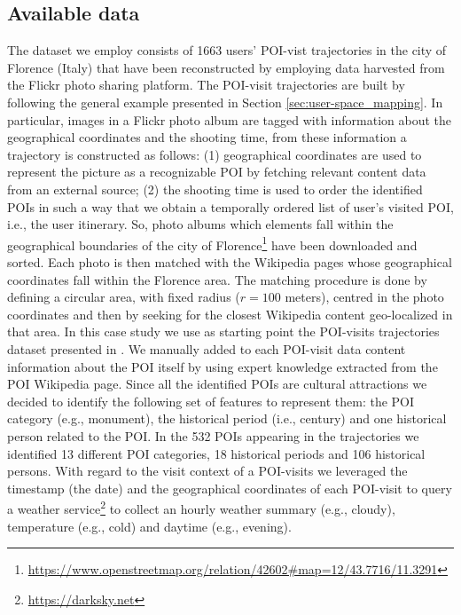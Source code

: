 \subsection{Available data}
The dataset we employ consists of 1663 users' POI-vist trajectories in the city of Florence (Italy) that have been reconstructed by employing data harvested from the Flickr photo sharing platform.
The POI-visit trajectories are built by following the general example presented in Section \ref{sec:user-space_mapping}.
In particular, images in a Flickr photo album are tagged with information about the geographical coordinates and the shooting time, from these information a trajectory is constructed as follows: (1) geographical coordinates are used to represent the picture as a recognizable POI by fetching relevant content data from an external source; (2) the shooting time is used to order the identified POIs in such a way that we obtain a temporally ordered list of user's visited POI, i.e., the user itinerary. 
So, photo albums which elements fall within the geographical boundaries of the city of Florence\footnote{\url{https://www.openstreetmap.org/relation/42602\#map=12/43.7716/11.3291}} have been downloaded and sorted.
Each photo is then matched with the Wikipedia pages whose geographical coordinates fall within the Florence area. The matching procedure is done by defining a circular area, with fixed radius ($r=100$ meters), centred in the photo coordinates and then by seeking  for the closest Wikipedia content geo-localized in that area.
In this case study we use as starting point the POI-visits trajectories dataset presented in \cite{flikr_tourism_RS:muntean:2015}.
We manually added to each POI-visit data content information about the POI itself by using expert knowledge extracted from the POI Wikipedia page. Since all the identified POIs are cultural attractions we decided to identify the following set of features to represent them: the POI category (e.g., monument), the historical period (i.e., century) and one historical person related to the POI. In the 532 POIs appearing in the trajectories we identified 13 different POI categories, 18 historical periods and 106 historical persons. 
With regard to the visit context of a POI-visits we leveraged the timestamp (the date) and the geographical coordinates of each POI-visit to query a weather service\footnote{\url{https://darksky.net}} to collect an hourly weather summary (e.g., cloudy), temperature (e.g., cold) and daytime (e.g., evening). 

